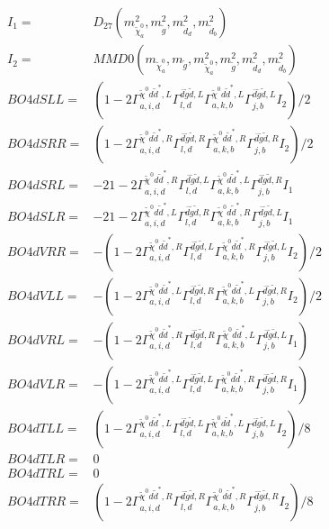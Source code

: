 \documentclass[A4,landscape]{article}
\begin{document}
\begin{align} 
I_1 = & D_{27}(m^2_{\tilde{\chi}^0_{{a}}}, m^2_{\tilde{g}}, m^2_{\tilde{d}_{{d}}}, m^2_{\tilde{d}_{{b}}}) \\ 
I_2 = & MMD0(m_{\tilde{\chi}^0_{{a}}}, m_{\tilde{g}}, m^2_{\tilde{\chi}^0_{{a}}}, m^2_{\tilde{g}}, m^2_{\tilde{d}_{{d}}}, m^2_{\tilde{d}_{{b}}}) \\ 
  BO4dSLL= & (1
-
2 \Gamma^{\tilde{\chi}^0 d \tilde{d}^*,L}_{a, i, d} \Gamma^{\bar{d}\tilde{g} \tilde{d} ,L}_{l, d} \Gamma^{\tilde{\chi}^0 d \tilde{d}^*,L}_{a, k, b} \Gamma^{\bar{d}\tilde{g} \tilde{d} ,L}_{j, b} I_2)/2 \\ 
  BO4dSRR= & (1
-
2 \Gamma^{\tilde{\chi}^0 d \tilde{d}^*,R}_{a, i, d} \Gamma^{\bar{d}\tilde{g} \tilde{d} ,R}_{l, d} \Gamma^{\tilde{\chi}^0 d \tilde{d}^*,R}_{a, k, b} \Gamma^{\bar{d}\tilde{g} \tilde{d} ,R}_{j, b} I_2)/2 \\ 
  BO4dSRL= & -2 1
-
2 \Gamma^{\tilde{\chi}^0 d \tilde{d}^*,R}_{a, i, d} \Gamma^{\bar{d}\tilde{g} \tilde{d} ,L}_{l, d} \Gamma^{\tilde{\chi}^0 d \tilde{d}^*,L}_{a, k, b} \Gamma^{\bar{d}\tilde{g} \tilde{d} ,R}_{j, b} I_1 \\ 
  BO4dSLR= & -2 1
-
2 \Gamma^{\tilde{\chi}^0 d \tilde{d}^*,L}_{a, i, d} \Gamma^{\bar{d}\tilde{g} \tilde{d} ,R}_{l, d} \Gamma^{\tilde{\chi}^0 d \tilde{d}^*,R}_{a, k, b} \Gamma^{\bar{d}\tilde{g} \tilde{d} ,L}_{j, b} I_1 \\ 
  BO4dVRR= & -(1
-
2 \Gamma^{\tilde{\chi}^0 d \tilde{d}^*,R}_{a, i, d} \Gamma^{\bar{d}\tilde{g} \tilde{d} ,L}_{l, d} \Gamma^{\tilde{\chi}^0 d \tilde{d}^*,R}_{a, k, b} \Gamma^{\bar{d}\tilde{g} \tilde{d} ,L}_{j, b} I_2)/2 \\ 
  BO4dVLL= & -(1
-
2 \Gamma^{\tilde{\chi}^0 d \tilde{d}^*,L}_{a, i, d} \Gamma^{\bar{d}\tilde{g} \tilde{d} ,R}_{l, d} \Gamma^{\tilde{\chi}^0 d \tilde{d}^*,L}_{a, k, b} \Gamma^{\bar{d}\tilde{g} \tilde{d} ,R}_{j, b} I_2)/2 \\ 
  BO4dVRL= & -(1
-
2 \Gamma^{\tilde{\chi}^0 d \tilde{d}^*,R}_{a, i, d} \Gamma^{\bar{d}\tilde{g} \tilde{d} ,R}_{l, d} \Gamma^{\tilde{\chi}^0 d \tilde{d}^*,L}_{a, k, b} \Gamma^{\bar{d}\tilde{g} \tilde{d} ,L}_{j, b} I_1) \\ 
  BO4dVLR= & -(1
-
2 \Gamma^{\tilde{\chi}^0 d \tilde{d}^*,L}_{a, i, d} \Gamma^{\bar{d}\tilde{g} \tilde{d} ,L}_{l, d} \Gamma^{\tilde{\chi}^0 d \tilde{d}^*,R}_{a, k, b} \Gamma^{\bar{d}\tilde{g} \tilde{d} ,R}_{j, b} I_1) \\ 
  BO4dTLL= & (1
-
2 \Gamma^{\tilde{\chi}^0 d \tilde{d}^*,L}_{a, i, d} \Gamma^{\bar{d}\tilde{g} \tilde{d} ,L}_{l, d} \Gamma^{\tilde{\chi}^0 d \tilde{d}^*,L}_{a, k, b} \Gamma^{\bar{d}\tilde{g} \tilde{d} ,L}_{j, b} I_2)/8 \\ 
  BO4dTLR= & 0 \\ 
  BO4dTRL= & 0 \\ 
  BO4dTRR= & (1
-
2 \Gamma^{\tilde{\chi}^0 d \tilde{d}^*,R}_{a, i, d} \Gamma^{\bar{d}\tilde{g} \tilde{d} ,R}_{l, d} \Gamma^{\tilde{\chi}^0 d \tilde{d}^*,R}_{a, k, b} \Gamma^{\bar{d}\tilde{g} \tilde{d} ,R}_{j, b} I_2)/8 \\ 
\end{align} 
\end{document}

